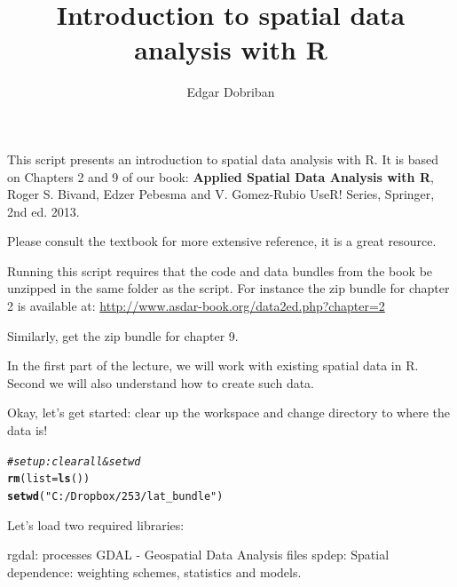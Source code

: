 \documentclass{article}\usepackage[]{graphicx}\usepackage[]{color}
\makeatletter
\newcommand{\hlstr}[1]{\textcolor[rgb]{0.192,0.494,0.8}{#1}}%
\newcommand{\hlcom}[1]{\textcolor[rgb]{0.678,0.584,0.686}{\textit{#1}}}%
\newcommand{\hlstd}[1]{\textcolor[rgb]{0.345,0.345,0.345}{#1}}%
\newcommand{\hlkwc}[1]{\textcolor[rgb]{0.333,0.667,0.333}{#1}}%
\newcommand{\hlkwd}[1]{\textcolor[rgb]{0.737,0.353,0.396}{\textbf{#1}}}%
\newenvironment{kframe}{%
 \def\at@end@of@kframe{}%
 \ifinner\ifhmode%
  \def\at@end@of@kframe{\end{minipage}}%
  \begin{minipage}{\columnwidth}%
 \fi\fi%
 \def\FrameCommand##1{\hskip\@totalleftmargin \hskip-\fboxsep
 \colorbox{shadecolor}{##1}\hskip-\fboxsep
     \hskip-\linewidth \hskip-\@totalleftmargin \hskip\columnwidth}%
 \MakeFramed {\advance\hsize-\width
   \@totalleftmargin\z@ \linewidth\hsize
   \@setminipage}}%
 {\par\unskip\endMakeFramed%
 \at@end@of@kframe}
\newenvironment{knitrout}{}{} %
\makeatother
\begin{document}
\title{Introduction to spatial data analysis with R}
\author{Edgar Dobriban}

\maketitle
  This script presents an introduction to spatial data analysis with R. It is based on Chapters 2 and 9 of our book: \textbf{Applied Spatial Data Analysis with R}, Roger S. Bivand, Edzer Pebesma and V. Gomez-Rubio
   UseR! Series, Springer, 2nd ed. 2013.
   
   Please consult the textbook for more extensive reference, it is a great resource.
   
  Running this script requires that the code and data bundles from the book be unzipped in the same folder as the script. For instance the zip bundle for chapter 2 is available at: 
  \url{http://www.asdar-book.org/data2ed.php?chapter=2}

Similarly, get the zip bundle for chapter 9.
 
In the first part of the lecture, we will work with existing spatial data in R. Second we will also understand how to create such data.

Okay, let's get started: clear up the workspace and change directory to where the data is!

\begin{knitrout}
\color{fgcolor}\begin{kframe}
\begin{alltt}
\hlcom{#set up: clear all  & set wd}
\hlkwd{rm}\hlstd{(}\hlkwc{list}\hlstd{=}\hlkwd{ls}\hlstd{())}
\hlkwd{setwd}\hlstd{(}\hlstr{"C:/Dropbox/253/lat_bundle"}\hlstd{)}
\end{alltt}
\end{kframe}
\end{knitrout}

Let's load two required libraries:

rgdal: processes GDAL - Geospatial Data Analysis files
spdep: Spatial dependence: weighting schemes, statistics and models.
\end{document}
